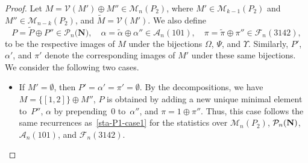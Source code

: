 \documentclass[10pt,a4paper]{amsart}
\newcommand{\A}{\mathcal{A}}
\newcommand{\F}{\mathcal{F}}
\newcommand{\M}{\mathcal{M}}
\newcommand{\PP}{{\mathcal P}}
\newcommand{\V}{\mathcal{V}}
\begin{document}
	\begin{proof} 
		Let $M= \V(M') \oplus M'' \in \M_n(P_2)$, where $M' \in \M_{k-1}(P_2)$ and $M'' \in \M_{n-k}(P_2)$, and $\widetilde{M}=\V(M')$. 
		We also define
		\[
		P=\widetilde{P}\oplus P''\in\PP_{n}\textbf{(N)},\quad
		\alpha=\widetilde{\alpha}\oplus\alpha'' \in \A_n(101),\quad
		\pi=\widetilde{\pi}\oplus\pi'' \in \F_n(3142),
		\]
		to be the respective images of $M$ under the bijections $\Omega$, $\Psi$, and $\Upsilon$. Similarly, $P'$, $\alpha'$, and $\pi'$ denote the corresponding images of $M'$ under these same bijections. We consider the following two cases.
		\begin{itemize}
			\item If $M' =\emptyset$, then $P'=\alpha'=\pi'=\emptyset$. 
			By the decompositions, we have  
			$M=\{[1,2]\}\oplus M''$,  
			$P$ is obtained by adding a new unique minimal element to~$P''$, 
			$\alpha$ by prepending~$0$ to~$\alpha''$, and  
			$\pi=1\oplus \pi''$. 
			Thus, this case follows the same recurrences as~\eqref{sta-P1-case1} for the statistics over $\M_n(P_{2})$, $\PP_{n}\bf{(N)}$, $\A_n(101)$, and $\F_n(3142)$.
			

\end{itemize}
\end{proof}
\end{document}
